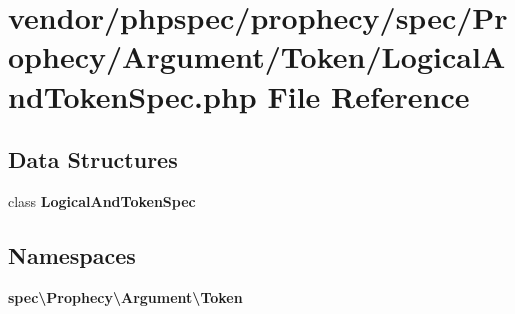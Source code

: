 \section{vendor/phpspec/prophecy/spec/\+Prophecy/\+Argument/\+Token/\+Logical\+And\+Token\+Spec.php File Reference}
\label{_logical_and_token_spec_8php}
\subsection*{Data Structures}
\begin{DoxyCompactItemize}
\item 
class {\bf Logical\+And\+Token\+Spec}
\end{DoxyCompactItemize}
\subsection*{Namespaces}
\begin{DoxyCompactItemize}
\item 
 {\bf spec\textbackslash{}\+Prophecy\textbackslash{}\+Argument\textbackslash{}\+Token}
\end{DoxyCompactItemize}
